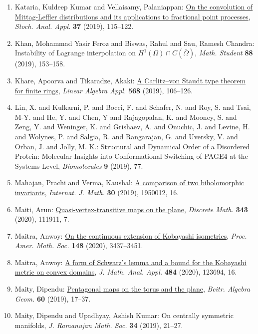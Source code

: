 \begin{enumerate}
\item Kataria, Kuldeep Kumar and Vellaisamy, Palaniappan: \href{https://doi.org/10.1080/07362994.2018.1538803}{On the convolution of {M}ittag-{L}effler distributions and its
applications to fractional point processes}, \emph{Stoch. Anal. Appl.} {\bf 37} (2019), 115--122.
\item Khan, Mohammad Yasir Feroz and Biswas, Rahul and Sau, Ramesh
Chandra: Instability of {L}agrange interpolation on {$H^1(\Omega)\cap
C(\overline\Omega)$}, \emph{Math. Student} {\bf 88} (2019), 153--158.
\item Khare, Apoorva and Tikaradze, Akaki: \href{https://doi.org/10.1016/j.laa.2018.05.035}{A {C}arlitz--von {S}taudt type theorem for finite rings}, \emph{Linear Algebra Appl.} {\bf 568} (2019), 106--126.
\item Lin, X. and Kulkarni, P. and Bocci, F. and Schafer, N. and Roy, S. and Tsai, M-Y. and He, Y. and Chen, Y and Rajagopalan, K. and Mooney, S. and Zeng, Y. and Weninger, K. and Grishaev, A. and Onuchic, J. and Levine, H. and Wolynes, P. and Salgia, R. and Rangarajan, G. and Uversky, V. and Orban, J. and Jolly, M. K.: Structural and Dynamical Order of a Disordered Protein: Molecular Insights into Conformational Switching of PAGE4 at the Systems Level, \emph{Biomolecules} {\bf 9} (2019), 77.
\item Mahajan, Prachi and Verma, Kaushal: \href{https://doi.org/10.1142/S0129167X19500125}{A comparison of two biholomorphic invariants}, \emph{Internat. J. Math.} {\bf 30} (2019), 1950012, 16.
\item Maiti, Arun: \href{https://doi.org/10.1016/j.disc.2020.111911}{Quasi-vertex-transitive maps on the plane}, \emph{Discrete Math.} {\bf 343} (2020), 111911, 7.
\item Maitra, Anwoy: \href{https://doi.org/10.1090/proc/15038}{On the continuous extension of {K}obayashi isometries}, \emph{Proc. Amer. Math. Soc.} {\bf 148} (2020), 3437--3451.
\item Maitra, Anwoy: \href{https://doi.org/10.1016/j.jmaa.2019.123694}{A form of {S}chwarz's lemma and a bound for the {K}obayashi
metric on convex domains}, \emph{J. Math. Anal. Appl.} {\bf 484} (2020), 123694, 16.
\item Maity, Dipendu: \href{https://doi.org/10.1007/s13366-018-0405-7}{Pentagonal maps on the torus and the plane}, \emph{Beitr. Algebra Geom.} {\bf 60} (2019), 17--37.
\item Maity, Dipendu and Upadhyay, Ashish Kumar: On centrally symmetric manifolds, \emph{J. Ramanujan Math. Soc.} {\bf 34} (2019), 21--27.

\end{enumerate}
